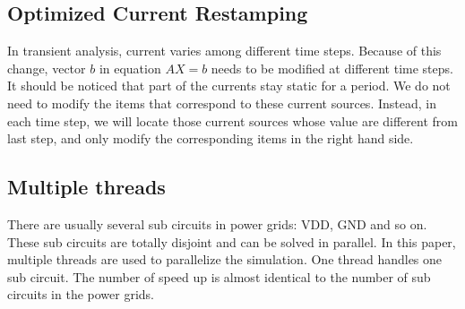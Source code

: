  \subsection{Optimized Current Restamping}
In transient analysis, current varies among different time steps. Because of this change, vector $b$ in equation $AX=b$ needs to be 
modified at different time steps. It should be noticed that part of the currents stay static for a period. We do not need to modify
the items that correspond to these current sources. Instead, in each time step, we will locate those current sources whose value are
different from last step, and only modify the corresponding items in the right hand side. 
  \subsection{Multiple threads}
There are usually several sub circuits in power grids: VDD, GND and so on. These sub circuits are totally disjoint and can be solved
in parallel. In this paper, multiple threads are used to parallelize the simulation. One thread handles one sub circuit. The number of
speed up is almost identical to the number of sub circuits in the power grids.
